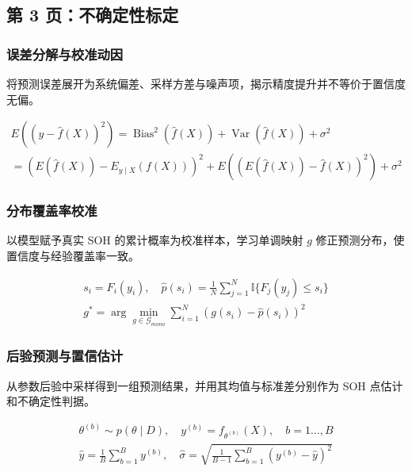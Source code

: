 ﻿\documentclass[UTF8,a4paper,10pt]{ctexart}
\begin{document}
\clearpage
\subsection{第 3 页：不确定性标定}

\subsubsection*{误差分解与校准动因}
将预测误差展开为系统偏差、采样方差与噪声项，揭示精度提升并不等价于置信度无偏。
\begin{formulabox}
\[\begin{gathered}
  E\left((y-\hat f(X))^2\right)
  = \operatorname{Bias}^2(\hat f(X))+\operatorname{Var}(\hat f(X))+\sigma^2 \\
  = \left(E(\hat f(X))-E_{y\mid X}(f(X))\right)^2
  +E\left((E(\hat f(X))-\hat f(X))^2\right)+\sigma^2
\end{gathered}\]
\end{formulabox}

\subsubsection*{分布覆盖率校准}
以模型赋予真实 SOH 的累计概率为校准样本，学习单调映射 $g$ 修正预测分布，使置信度与经验覆盖率一致。
\begin{formulabox}
\[\begin{gathered}
  s_i = F_i(y_i), \quad
  \hat p(s_i)
  = \frac{1}{N}\sum_{j=1}^{N}\mathbb{I}\{F_j(y_j)\leq s_i\} \\
  g^*
  = \arg\min_{g\in\mathcal{G}_{mono}}
  \sum_{i=1}^{N}\left(g(s_i)-\hat p(s_i)\right)^2 
\end{gathered}\]
\end{formulabox}

\subsubsection*{后验预测与置信估计}
从参数后验中采样得到一组预测结果，并用其均值与标准差分别作为 SOH 点估计和不确定性判据。
\begin{formulabox}
\[\begin{gathered}
  \theta^{(b)}\sim p(\theta\mid D), \quad
  y^{(b)}=f_{\theta^{(b)}}(X), \quad b=1\dots,B \\
  \hat{y}
  = \frac{1}{B}\sum_{b=1}^{B}y^{(b)}, \quad
  \hat{\sigma}
  = \sqrt{\frac{1}{B-1}
  \sum_{b=1}^{B}\left(y^{(b)}-\hat y\right)^2}
\end{gathered}\]
\end{formulabox}
\end{document}

